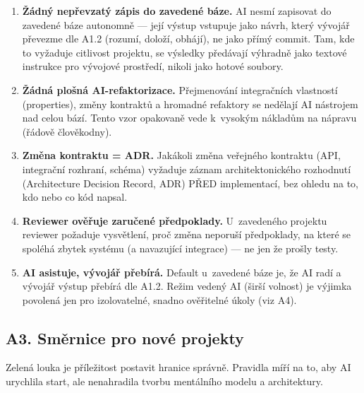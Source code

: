 \begin{enumerate}[label=\textbf{A2.\arabic*}]
\item \textbf{Žádný nepřevzatý zápis do zavedené báze.}
AI nesmí zapisovat do zavedené báze autonomně --- její výstup vstupuje jako návrh, který vývojář převezme dle A1.2 (rozumí, doloží, obhájí), ne jako přímý commit.
Tam, kde to vyžaduje citlivost projektu, se výsledky předávají výhradně jako textové instrukce pro vývojové prostředí, nikoli jako hotové soubory.
\item \textbf{Žádná plošná AI-refaktorizace.}
Přejmenování integračních vlastností (properties), změny kontraktů a hromadné refaktory se nedělají AI nástrojem nad celou bází.
Tento vzor opakovaně vede k~vysokým nákladům na nápravu (řádově člověkodny).
\item \textbf{Změna kontraktu = ADR.}
Jakákoli změna veřejného kontraktu (API, integrační rozhraní, schéma) vyžaduje záznam architektonického rozhodnutí (Architecture Decision Record, ADR) PŘED implementací, bez ohledu na to, kdo nebo co kód napsal.
\item \textbf{Reviewer ověřuje zaručené předpoklady.}
U~zavedeného projektu reviewer požaduje vysvětlení, proč změna neporuší předpoklady, na které se spoléhá zbytek systému (a navazující integrace) --- ne jen že prošly testy.
\item \textbf{AI asistuje, vývojář přebírá.}
Default u~zavedené báze je, že AI radí a vývojář výstup přebírá dle A1.2.
Režim vedený AI (širší volnost) je výjimka povolená jen pro izolovatelné, snadno ověřitelné úkoly (viz A4).
\end{enumerate}

\subsection{A3. Směrnice pro nové projekty}

Zelená louka je příležitost postavit hranice správně.
Pravidla míří na to, aby AI urychlila start, ale nenahradila tvorbu mentálního modelu a architektury.

